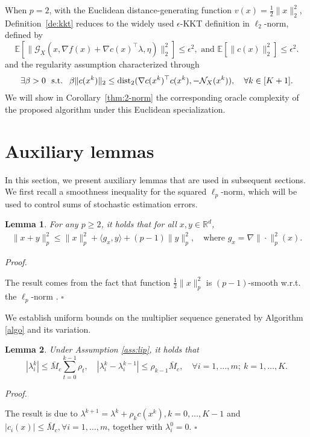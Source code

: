 \documentclass[11pt]{article}
\newtheorem{lemma}{Lemma}[section]
\newenvironment{proof}[1][Proof]{%
    \par\noindent\textit{#1.}\enspace
  }{%
    \hfill\ensuremath{\square}\par
  }%
\numberwithin{equation}{section}
\newcommand{\R}{\mathbb{R}}
\newcommand{\E}{\mathbb{E}}
\newcommand{\be}{\begin{equation}}
\newcommand{\ee}{\end{equation}}
\begin{document}
When $p=2$, with the Euclidean distance-generating
function $v(x)=\frac{1}{2}\|x\|_2^2$, Definition~\ref{de:kkt} reduces to the
widely used $\epsilon$-KKT definition in  $\ell_2$-norm,  defined by 
\be\label{eps-KKT-2}
\mathbb{E} [\|\mathcal{G}_X (x,\nabla f(x) + \nabla c(x)^\top\lambda,\eta)\|_2^2  ] \le \epsilon^2, \mbox{ and } \E[\|c(x)\|_2^2]\le \epsilon^2.
\ee
and the regularity assumption  characterized through 
 \begin{align}
\exists \beta>0\  \mbox{ s.t. }\  \beta \| c ( x^k  )   \|_2 \leq  {\rm dist}_2 ( {\nabla c} ( x^k )^\top c ( x^k ),  -\mathcal{N}_{X}(x^{k})  )  ,\quad \forall k \in  [ K+1  ] .\label{CQ_2}
 \end{align}
We will show in
Corollary~\ref{thm:2-norm} the corresponding oracle complexity of the proposed algorithm under this Euclidean specialization.
  

\section{Auxiliary lemmas} \label{sec4}
In this section, we present  auxiliary lemmas that are used in subsequent sections.  We first recall a smoothness inequality for the squared $\ell_p$-norm, which will be used to control sums of stochastic estimation errors.
\begin{lemma}\label{le:normp}
    For any $p \geq 2$,  it holds that for all $x,y \in \R^d$,
    \begin{align*}
        \|x+y\|_p^2 \leq \|x\|_p^2 + \langle g_x ,y \rangle + (p-1) \|y\|_p^2,\quad\mbox{where $g_x = \nabla \|\cdot\|_p^2(x)$.}
    \end{align*}  
\end{lemma}
\begin{proof}
    The result comes from the fact that function $\frac{1}{2}\|x\|_p^2$ is $(p-1)$-smooth w.r.t. the \(\ell_p\)-norm \cite{beck2017first}.
\end{proof}

We establish uniform bounds on the multiplier sequence generated by Algorithm \ref{algo} and its variation.
\begin{lemma}\label{new:z2}
    Under Assumption \ref{ass:lip}, it holds that  
    \[|\lambda_i^k| \le \bar{M}_c \sum_{t=0}^{k-1} \rho_t,\quad|\lambda_i^{k} - \lambda_i^{k-1}| \le \rho_{k-1} \bar{M}_c,\quad \forall i=1,\ldots,m;\ k = 1, \dots, K.\] 
      
\end{lemma}
\begin{proof}
    The result is due to \(\lambda^{k+1} = \lambda^k + \rho_k c(x^k), k=0,\ldots,K-1\) and \(|c_i(x)| \leq \bar{M}_c, \forall i=1,\ldots,m\), together with \(\lambda_i^0 = 0\).
\end{proof}
\end{document}
